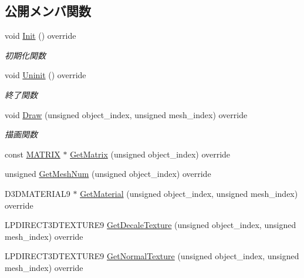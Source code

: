 \subsection*{公開メンバ関数}
\begin{DoxyCompactItemize}
\item 
void \mbox{\hyperlink{class_player_draw_ad79a0fbeb618e0913822b573e5d0be68}{Init}} () override
\begin{DoxyCompactList}\small\item\em 初期化関数 \end{DoxyCompactList}\item 
void \mbox{\hyperlink{class_player_draw_a917b2947914287f23d87ca75cd68f553}{Uninit}} () override
\begin{DoxyCompactList}\small\item\em 終了関数 \end{DoxyCompactList}\item 
void \mbox{\hyperlink{class_player_draw_a8b9e8caa6bea7295f58a0aaddeb9458b}{Draw}} (unsigned object\+\_\+index, unsigned mesh\+\_\+index) override
\begin{DoxyCompactList}\small\item\em 描画関数 \end{DoxyCompactList}\item 
const \mbox{\hyperlink{_vector3_d_8h_a032295cd9fb1b711757c90667278e744}{M\+A\+T\+R\+IX}} $\ast$ \mbox{\hyperlink{class_player_draw_a8edf1441ea23f298c6a0ca707f54021a}{Get\+Matrix}} (unsigned object\+\_\+index) override
\item 
unsigned \mbox{\hyperlink{class_player_draw_ad9e2e09a32c7474fcea5e7e24e22bc71}{Get\+Mesh\+Num}} (unsigned object\+\_\+index) override
\item 
D3\+D\+M\+A\+T\+E\+R\+I\+A\+L9 $\ast$ \mbox{\hyperlink{class_player_draw_ae818d3adaf5120845c2a78c230b5365e}{Get\+Material}} (unsigned object\+\_\+index, unsigned mesh\+\_\+index) override
\item 
L\+P\+D\+I\+R\+E\+C\+T3\+D\+T\+E\+X\+T\+U\+R\+E9 \mbox{\hyperlink{class_player_draw_a6cecfb28942044efff0b9d6213b511a5}{Get\+Decale\+Texture}} (unsigned object\+\_\+index, unsigned mesh\+\_\+index) override
\item 
L\+P\+D\+I\+R\+E\+C\+T3\+D\+T\+E\+X\+T\+U\+R\+E9 \mbox{\hyperlink{class_player_draw_abb93b530e38fc224ecbfe17d623f10fb}{Get\+Normal\+Texture}} (unsigned object\+\_\+index, unsigned mesh\+\_\+index) override
\end{DoxyCompactItemize}
